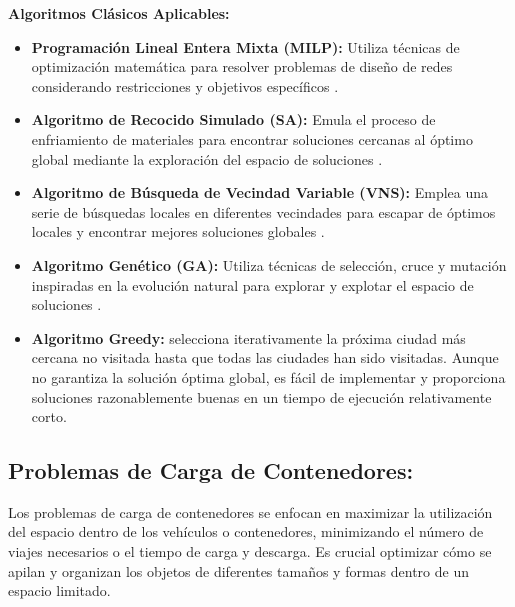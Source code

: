 \documentclass[11pt,a4paper,spanish]{book}
\begin{document}
	\textbf{Algoritmos Clásicos Aplicables:}
	\begin{itemize}
		\item \textbf{Programación Lineal Entera Mixta (MILP):} Utiliza técnicas de optimización matemática para resolver problemas de diseño de redes considerando restricciones y objetivos específicos \cite{nemhauser1999integer}.
		\item \textbf{Algoritmo de Recocido Simulado (SA):} Emula el proceso de enfriamiento de materiales para encontrar soluciones cercanas al óptimo global mediante la exploración del espacio de soluciones \cite{kirkpatrick1983optimization}.
		\item \textbf{Algoritmo de Búsqueda de Vecindad Variable (VNS):} Emplea una serie de búsquedas locales en diferentes vecindades para escapar de óptimos locales y encontrar mejores soluciones globales \cite{mladenovic1997variable}.
		\item \textbf{Algoritmo Genético (GA):} Utiliza técnicas de selección, cruce y mutación inspiradas en la evolución natural para explorar y explotar el espacio de soluciones \cite{holland1992adaptation}.
        \item \textbf{Algoritmo Greedy:}  selecciona iterativamente la próxima ciudad más cercana no visitada hasta que todas las ciudades han sido visitadas. Aunque no garantiza la solución óptima global, es fácil de implementar y proporciona soluciones razonablemente buenas en un tiempo de ejecución relativamente corto. \cite{Cormen2009}

  
	\end{itemize}
	
\subsection{Problemas de Carga de Contenedores:} 
	
	Los problemas de carga de contenedores se enfocan en maximizar la utilización del espacio dentro de los vehículos o contenedores, minimizando el número de viajes necesarios o el tiempo de carga y descarga. Es crucial optimizar cómo se apilan y organizan los objetos de diferentes tamaños y formas dentro de un espacio limitado.
	
\end{document}
